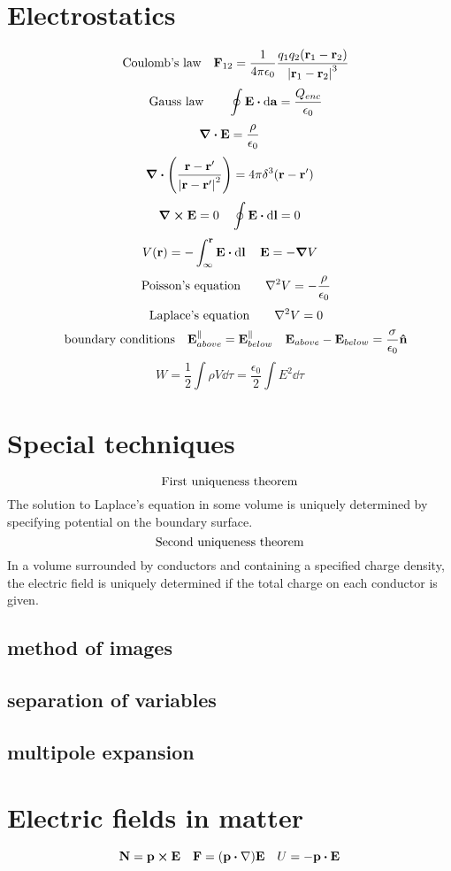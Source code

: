 \documentclass[12pt]{article}
\begin{document}
\section{Electrostatics}
\[\qq{Coulomb's law}\vb{F}_{12}=\frac{1}{4\pi\epsilon_0}\frac{q_1q_2(\vb{r}_1-\vb{r}_2)}{\vqty{\vb{r}_1-\vb{r}_2}^3}\]
\[\qq{Gauss law}\quad \oint\vb{E}\vdot\dd{\vb{a}}=\frac{Q_{enc}}{\epsilon_0}\]
\[\div{\vb{E}}=\frac{\rho}{\epsilon_0}\]
\[\div{\qty(\frac{\vb{r}-\vb{r}'}{\vqty{\vb{r}-\vb{r}'}^2})}=4\pi\delta^3(\vb{r}-\vb{r}')\]
\[\curl{\vb{E}}=0\quad \oint\vb{E}\vdot\dd{\vb{l}}=0\]
\[V(\vb{r})=-\int_{\infty}^{\vb{r}}\vb{E}\vdot\dd{\vb{l}}\quad\vb{E}=-\grad{V}\]
\[\qq{Poisson's equation}\quad\laplacian{V}=-\frac{\rho}{\epsilon_0}\]
\[\qq{Laplace's equation} \quad\laplacian{V}=0\]
\[\qq{boundary conditions} \vb{E}^{\parallel}_{above}=\vb{E}^{\parallel}_{below}\quad \vb{E}_{above}-\vb{E}_{below}=\frac{\sigma}{\epsilon_0}\vu{n} \]
\[W=\frac{1}{2}\int\rho{V}\dd{\tau}=\frac{\epsilon_0}{2}\int{E^2}\dd\tau\]

\section{Special techniques}
\[\qq{First uniqueness theorem}\]
The solution to Laplace's equation in some volume is uniquely determined by specifying potential on the boundary surface.
\[\qq{Second uniqueness theorem}\]
In a volume surrounded by conductors and containing a specified charge density, the electric field is uniquely determined if the total charge on each conductor is given.

\subsection*{method of images}

\subsection*{separation of variables}

\subsection*{multipole expansion}

\section{Electric fields in matter}
\[\vb{N}=\vb{p}\cp\vb{E}\quad\vb{F}=\qty(\vb{p}\vdot\nabla)\vb{E}\quad U=-\vb{p}\vdot\vb{E}\]
\end{document}
